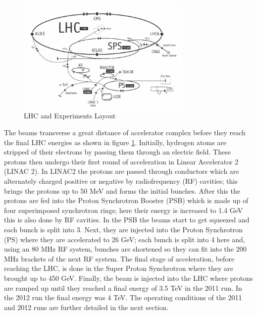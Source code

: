 \begin{figure}[t]
  \centering
	\includegraphics[width=0.75\textwidth]{images/LHCLayout.png}
  	\caption[e/$\gamma$ LHC Layout]
   	{LHC and Experiments Layout}
	\label{fig:LHCRings}
\end{figure}
The beams transverse a great distance of accelerator complex %
before they reach the final LHC energies as shown in figure \ref{fig:LHCRings}.%
Initially, hydrogen atoms are stripped of their electrons by passing them
through an electric field. These protons
then undergo their first round of acceleration in Linear Accelerator 2 (LINAC 2).
In LINAC2 the protons are passed through conductors which
are alternately charged positive or negative by radiofrequency (RF) cavities;
this brings the protons up to 50 MeV and forms the initial bunches. 
After this the protons are
fed into the Proton Synchrotron Booster (PSB) which is made up 
of four superimposed synchrotron rings; here their energy
is increased to 1.4 GeV this is also done by RF cavities. In
the PSB the beams start to get squeezed and each bunch is 
split into 3. 
Next, they are injected into the Proton
Synchrotron (PS) where they are accelerated to 26 GeV; each
bunch is split into 4 here and, using an 80 MHz RF system,
bunches are shortened so they can fit into the 200 MHz brackets
of the next RF system. The final
stage of acceleration, before reaching the LHC, is done in the
Super Proton Synchrotron where they are brought up to 450 GeV.
Finally, the beam is injected into the LHC where protons are ramped
up until they reached a final energy of 3.5 TeV 
in the 2011 run. In the 2012 run the final energy was 4 TeV. 
The operating conditions of the 2011 and 2012 runs are further
detailed in the next section.


